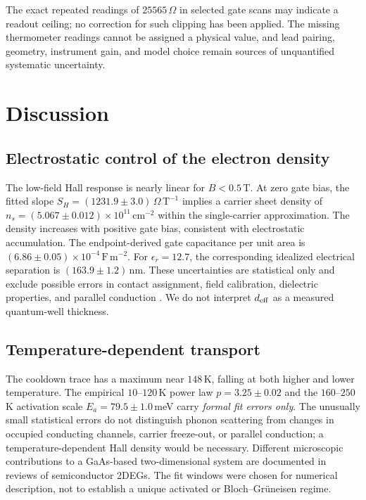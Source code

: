 \documentclass[
    aps,
    prb, 
    twocolumn, superscriptaddress,
    amsmath,
    amssymb,
    floatfix
]{revtex4-2}
\begin{document}
The exact repeated readings of $25565\,\Omega$ in selected gate scans may indicate a readout ceiling; no correction for such clipping has been applied. The missing thermometer readings cannot be assigned a physical value, and lead pairing, geometry, instrument gain, and model choice remain sources of unquantified systematic uncertainty.

\section{Discussion}
\label{sec:discussion}

\subsection{Electrostatic control of the electron density}

The low-field Hall response is nearly linear for $B<0.5\,\mathrm{T}$. At zero gate bias, the fitted slope $S_H=(1231.9\pm3.0)\, \Omega\,\mathrm{T}^{-1}$ implies a carrier sheet density of $n_s=(5.067\pm0.012)\times10^{11}\,\mathrm{cm}^{-2}$ within the single-carrier approximation.
The density increases with positive gate bias, consistent with electrostatic accumulation. The endpoint-derived gate capacitance per unit area is $(6.86\pm0.05)\times10^{-4} \,\mathrm{F\,m^{-2}}$. For $\epsilon_r=12.7$, the corresponding idealized electrical separation is $(163.9\pm1.2)\,\mathrm{nm}$. These uncertainties are statistical only and exclude possible errors in contact assignment, field calibration, dielectric properties, and parallel conduction \cite{ando1982,weisbuch1991}. We do not interpret $d_{\rm eff}$ as a measured quantum-well thickness. \subsection{Temperature-dependent transport} The cooldown trace has a maximum near $148\,$K, falling at both higher and lower temperature. The empirical $10$--$120\,$K power law $p=3.25\pm0.02$ and the $160$--$250\,$K activation scale $E_a=79.5\pm1.0\,$meV carry \emph{formal fit errors only}. The unusually small statistical errors do not distinguish phonon scattering from changes in occupied conducting channels, carrier freeze-out, or parallel conduction; a temperature-dependent Hall density would be necessary. Different microscopic contributions to a GaAs-based two-dimensional system are documented in reviews of semiconductor 2DEGs\cite{ando1982,weisbuch1991}. The fit windows were chosen for numerical description, not to establish a unique activated or Bloch--Gr\"uneisen regime.
\end{document}
